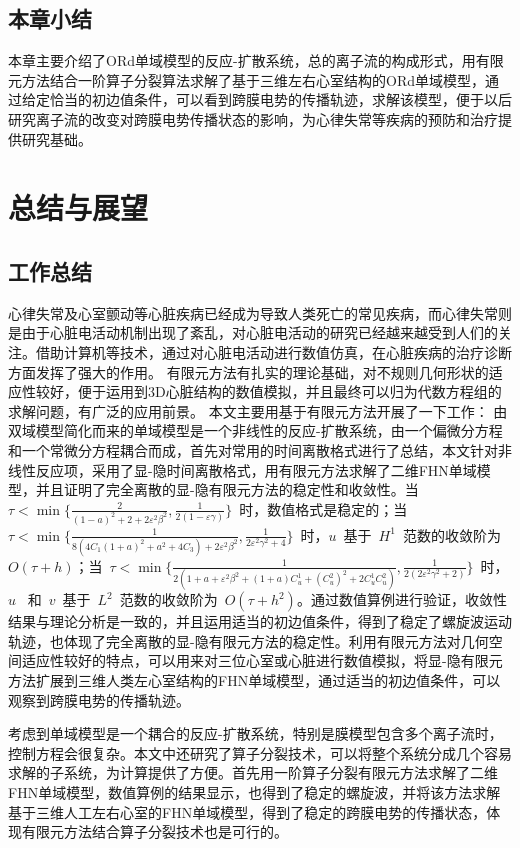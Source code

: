\documentclass[twoside,UTF8]{nputhesis}
\begin{document}
\section{本章小结}
本章主要介绍了ORd单域模型的反应-扩散系统，总的离子流的构成形式，用有限元方法结合一阶算子分裂算法求解了基于三维左右心室结构的ORd单域模型，通过给定恰当的初边值条件，可以看到跨膜电势的传播轨迹，求解该模型，便于以后研究离子流的改变对跨膜电势传播状态的影响，为心律失常等疾病的预防和治疗提供研究基础。


\chapter{总结与展望}

\section{工作总结}
心律失常及心室颤动等心脏疾病已经成为导致人类死亡的常见疾病，而心律失常则是由于心脏电活动机制出现了紊乱，对心脏电活动的研究已经越来越受到人们的关注。借助计算机等技术，通过对心脏电活动进行数值仿真，在心脏疾病的治疗诊断方面发挥了强大的作用。
有限元方法有扎实的理论基础，对不规则几何形状的适应性较好，便于运用到3D心脏结构的数值模拟，并且最终可以归为代数方程组的求解问题，有广泛的应用前景。
本文主要用基于有限元方法开展了一下工作：
由双域模型简化而来的单域模型是一个非线性的反应-扩散系统，由一个偏微分方程和一个常微分方程耦合而成，首先对常用的时间离散格式进行了总结，本文针对非线性反应项，采用了显-隐时间离散格式，用有限元方法求解了二维FHN单域模型，并且证明了完全离散的显-隐有限元方法的稳定性和收敛性。当$\tau<\min\{\frac{2}{(1-a)^2+2+2\varepsilon^2\beta^2},\frac{1}{2(1-\varepsilon\gamma)}\}$~时，数值格式是稳定的；当$\tau<\min\{\frac{1}{8(4C_1(1+a)^2+a^2+4C_3)+2\varepsilon^2\beta^2},\frac{1}{2\varepsilon^2\gamma^2+4}\}$~时，$u$~基于~$H^1$~范数的收敛阶为$O(\tau+h)$；当~$\tau<\min\{\frac{1}{2(1+a+\varepsilon^2\beta^2+(1+a)C_u^1+(C_u^2)^2+2C_u^1C_u^2)},\frac{1}{2(2\varepsilon^2\gamma^2+2)}\}$~时，$u$~ 和~$v$~基于~$L^2$~范数的收敛阶为~$O(\tau+h^2)$。通过数值算例进行验证，收敛性结果与理论分析是一致的，并且运用适当的初边值条件，得到了稳定了螺旋波运动轨迹，也体现了完全离散的显-隐有限元方法的稳定性。利用有限元方法对几何空间适应性较好的特点，可以用来对三位心室或心脏进行数值模拟，将显-隐有限元方法扩展到三维人类左心室结构的FHN单域模型，通过适当的初边值条件，可以观察到跨膜电势的传播轨迹。

考虑到单域模型是一个耦合的反应-扩散系统，特别是膜模型包含多个离子流时，控制方程会很复杂。本文中还研究了算子分裂技术，可以将整个系统分成几个容易求解的子系统，为计算提供了方便。首先用一阶算子分裂有限元方法求解了二维FHN单域模型，数值算例的结果显示，也得到了稳定的螺旋波，并将该方法求解基于三维人工左右心室的FHN单域模型，得到了稳定的跨膜电势的传播状态，体现有限元方法结合算子分裂技术也是可行的。
\end{document}
